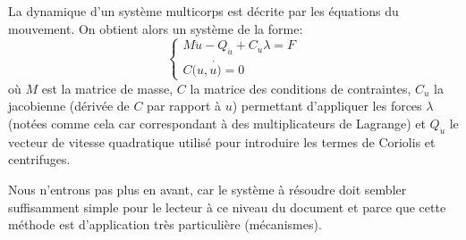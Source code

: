 \medskip
La dynamique d'un système multicorps est décrite par les équations du mouvement.
On obtient alors un système de la forme:
\begin{equation}
\left\{
\begin{array}{l}
M \ddot{u} - Q_{\dot{u}} + C_u\lambda = F\\
C(u,\dot{u)}=0
\end{array}
\right.
\end{equation}
où $M$ est la matrice de masse, $C$ la matrice des conditions de contraintes, $C_u$ la jacobienne
(dérivée de $C$ par rapport à $u$) permettant d'appliquer les forces $\lambda$ (notées
comme cela car correspondant à des multiplicateurs de Lagrange) et $Q_{\dot{u}}$ le vecteur
de vitesse quadratique utilisé pour introduire les termes de Coriolis et centrifuges.

\medskip
Nous n'entrons pas plus en avant, car le système à résoudre doit sembler suffisamment
simple pour le lecteur à ce niveau du document et parce que cette méthode
est d'application très particulière (mécanismes).
